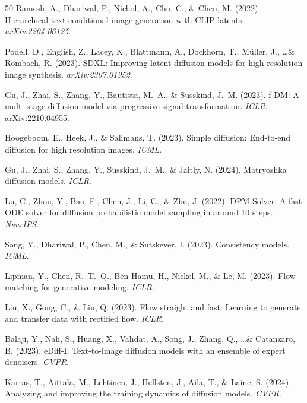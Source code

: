 \documentclass[10pt]{article}
\begin{document}
\begin{thebibliography}{50}
Ramesh, A., Dhariwal, P., Nichol, A., Chu, C., \& Chen, M. (2022).
\newblock Hierarchical text-conditional image generation with CLIP latents.
\newblock \emph{arXiv:2204.06125}.

Podell, D., English, Z., Lacey, K., Blattmann, A., Dockhorn, T., M{\"u}ller, J., \ldots \& Rombach, R. (2023).
\newblock SDXL: Improving latent diffusion models for high-resolution image synthesis.
\newblock \emph{arXiv:2307.01952}.

Gu, J., Zhai, S., Zhang, Y., Bautista, M.~A., \& Susskind, J.~M. (2023).
\newblock f-DM: A multi-stage diffusion model via progressive signal transformation.
\newblock \emph{ICLR}. arXiv:2210.04955.

Hoogeboom, E., Heek, J., \& Salimans, T. (2023).
\newblock Simple diffusion: End-to-end diffusion for high resolution images.
\newblock \emph{ICML}.

Gu, J., Zhai, S., Zhang, Y., Susskind, J.~M., \& Jaitly, N. (2024).
\newblock Matryoshka diffusion models.
\newblock \emph{ICLR}.

Lu, C., Zhou, Y., Bao, F., Chen, J., Li, C., \& Zhu, J. (2022).
\newblock DPM-Solver: A fast ODE solver for diffusion probabilistic model sampling in around 10 steps.
\newblock \emph{NeurIPS}.

Song, Y., Dhariwal, P., Chen, M., \& Sutskever, I. (2023).
\newblock Consistency models.
\newblock \emph{ICML}.

Lipman, Y., Chen, R.~T.~Q., Ben-Hamu, H., Nickel, M., \& Le, M. (2023).
\newblock Flow matching for generative modeling.
\newblock \emph{ICLR}.

Liu, X., Gong, C., \& Liu, Q. (2023).
\newblock Flow straight and fast: Learning to generate and transfer data with rectified flow.
\newblock \emph{ICLR}.

Balaji, Y., Nah, S., Huang, X., Vahdat, A., Song, J., Zhang, Q., \ldots \& Catanzaro, B. (2023).
\newblock eDiff-I: Text-to-image diffusion models with an ensemble of expert denoisers.
\newblock \emph{CVPR}.

Karras, T., Aittala, M., Lehtinen, J., Hellsten, J., Aila, T., \& Laine, S. (2024).
\newblock Analyzing and improving the training dynamics of diffusion models.
\newblock \emph{CVPR}.


\end{thebibliography}
\end{document}
